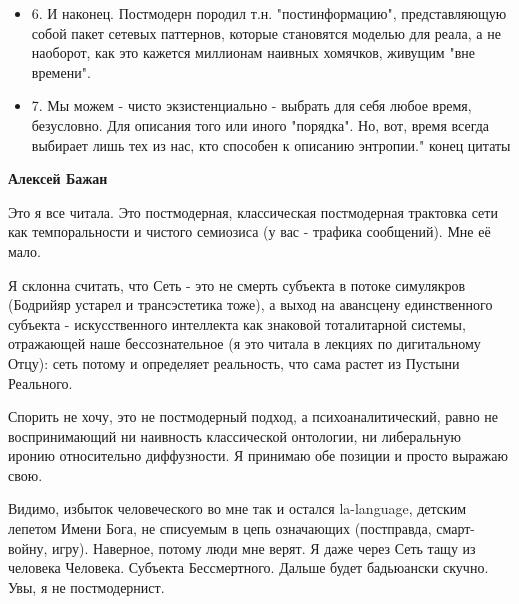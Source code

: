 \begin{itemize}
\begin{itemize}
\begin{itemize}
\item 6. И наконец. Постмодерн породил т.н. "постинформацию", представляющую собой
пакет сетевых паттернов, которые становятся моделью для реала, а не наоборот,
как это кажется миллионам наивных хомячков, живущим "вне времени".

\item 7. Мы можем - чисто экзистенциально - выбрать для себя любое время, безусловно.
Для описания того или иного "порядка". Но, вот, время всегда выбирает лишь тех
из нас, кто способен к описанию энтропии." конец цитаты

\end{itemize}

 

\textbf{Алексей Бажан} 

Это я все читала. Это постмодерная, классическая постмодерная трактовка сети
как темпоральности и чистого семиозиса (у вас - трафика сообщений). Мне её
мало. 

Я склонна считать, что Сеть - это не смерть субъекта в потоке симулякров
(Бодрийяр устарел и трансэстетика тоже), а выход на авансцену единственного
субъекта - искусственного интеллекта как знаковой тоталитарной системы,
отражающей наше бессознательное (я это читала в лекциях по дигитальному Отцу):
сеть потому и определяет реальность, что сама растет из Пустыни Реального.

Спорить не хочу, это не постмодерный подход, а психоаналитический, равно не
воспринимающий ни наивность классической онтологии, ни либеральную иронию
относительно диффузности. Я принимаю обе позиции и просто выражаю свою. 

Видимо, избыток человеческого во мне так и остался la-language, детским лепетом
Имени Бога, не списуемым в цепь означающих (постправда, смарт-войну, игру).
Наверное, потому люди мне верят. Я даже через Сеть тащу из человека Человека.
Субъекта Бессмертного. Дальше будет бадьюански скучно. Увы, я не постмодернист.

 

\end{itemize}
\end{itemize}
